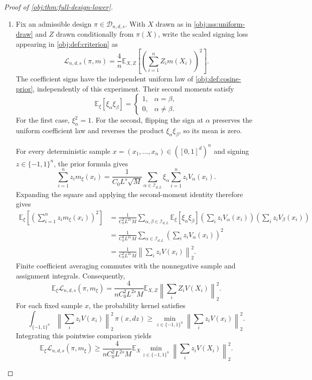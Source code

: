 \begin{proof}[Proof of \cref{obj:thm:full-design-lower}]
\begin{enumerate}
\item
Fix an admissible design \(\pi\in\mathcal D_{n,d,s}\). With \(X\) drawn as in
\cref{obj:ass:uniform-draw} and \(Z\) drawn conditionally from \(\pi(X)\), write the scaled signing loss appearing in \cref{obj:def:criterion} as
\[
\mathcal L_{n,d,s}(\pi,m)
=\frac4n\mathbb E_{X,Z}
 \left[\left(\sum_{i=1}^n Z_i m(X_i)\right)^2\right].
\]
The coefficient signs have the independent uniform law of
\cref{obj:def:cosine-prior}, independently of this experiment. Their second moments satisfy
\[
\mathbb E_\xi[\xi_\alpha\xi_\beta]
=
\begin{cases}
1,&\alpha=\beta,\\
0,&\alpha\ne\beta.
\end{cases}
\]
For the first case, \(\xi_\alpha^2=1\). For the second, flipping the sign at
\(\alpha\) preserves the uniform coefficient law and reverses the product
\(\xi_\alpha\xi_\beta\), so its mean is zero.

For every deterministic sample
\(x=(x_1,\ldots,x_n)\in([0,1]^d)^n\) and signing
\(z\in\{-1,1\}^n\), the prior formula gives
\[
\sum_{i=1}^n z_i m_\xi(x_i)
=\frac{1}{C_0L^s\sqrt M}
 \sum_{\alpha\in\mathcal I_{d,L}}
 \xi_\alpha\sum_{i=1}^n z_iV_\alpha(x_i).
\]
Expanding the square and applying the second-moment identity therefore gives
\[
\begin{aligned}
\mathbb E_\xi
 \left[\left(\sum_{i=1}^n z_i m_\xi(x_i)\right)^2\right]
&=\frac{1}{C_0^2L^{2s}M}
 \sum_{\alpha,\beta\in\mathcal I_{d,L}}
 \mathbb E_\xi[\xi_\alpha\xi_\beta]
 \left(\sum_i z_iV_\alpha(x_i)\right)
 \left(\sum_i z_iV_\beta(x_i)\right)\\
&=\frac{1}{C_0^2L^{2s}M}
 \sum_{\alpha\in\mathcal I_{d,L}}
 \left(\sum_i z_iV_\alpha(x_i)\right)^2\\
&=\frac{1}{C_0^2L^{2s}M}
 \left\|\sum_i z_iV(x_i)\right\|_2^2.
\end{aligned}
\]
Finite coefficient averaging commutes with the nonnegative sample and assignment integrals. Consequently,
\[
\mathbb E_\xi\mathcal L_{n,d,s}(\pi,m_\xi)
=\frac{4}{nC_0^2L^{2s}M}
 \mathbb E_{X,Z}
 \left\|\sum_i Z_iV(X_i)\right\|_2^2.
\]
For each fixed sample \(x\), the probability kernel satisfies
\[
\int_{\{-1,1\}^n}
 \left\|\sum_i z_iV(x_i)\right\|_2^2\,\pi(x,dz)
\geq
\min_{z\in\{-1,1\}^n}
 \left\|\sum_i z_iV(x_i)\right\|_2^2.
\]
Integrating this pointwise comparison yields
\[
\mathbb E_\xi\mathcal L_{n,d,s}(\pi,m_\xi)
\geq
\frac{4}{nC_0^2L^{2s}M}
\mathbb E_X
 \min_{z\in\{-1,1\}^n}
 \left\|\sum_i z_iV(X_i)\right\|_2^2.
\]


\end{enumerate}
\end{proof}
